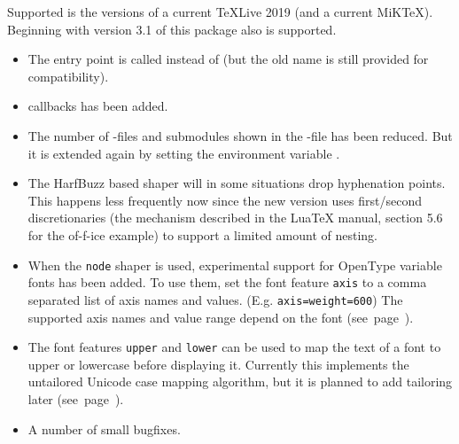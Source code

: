 Supported is the  versions of a current TeXLive 2019 (and a current MiKTeX). Beginning with version 3.1 of this package also  is supported.
\endsection

\begin{itemize}
  \item The entry point is called  instead of
      (but the old name is still provided for compatibility).
  \item  {} callbacks has been added.
  \item  The number of -files and submodules shown in the -file has been reduced. But it
   is extended again by setting the environment variable .
  \item The HarfBuzz based shaper will in some situations drop hyphenation
   points. This happens less frequently now since the new version uses
   first/second discretionaries (the mechanism described in the LuaTeX manual,
   section 5.6 for the of-f-ice example) to support a limited amount of
   nesting.
  \item When the \texttt{node} shaper is used, experimental support for OpenType variable
   fonts has been added. To use them, set the font feature \texttt{axis} to
   a comma separated list of axis names and values. (E.g.  \texttt{axis={weight=600}})
   The supported axis names and value range depend on the font (see~page~\pageref{variablefonts}).
 \item The font features \texttt{upper} and \texttt{lower} can be used to map
   the text of a font to upper or lowercase before displaying it. Currently
   this implements the untailored Unicode case mapping algorithm, but it is
   planned to add tailoring later (see~page~\pageref{upperlower}).
  \item A number of small bugfixes.
 \end{itemize}
\endsubsection

